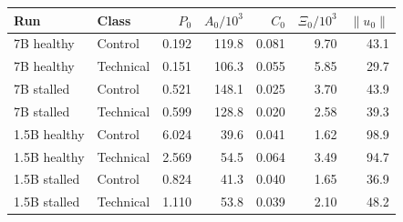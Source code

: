 \begin{tabular}{llrrrrr}
\toprule
Run & Class & $P_0$ & $A_0/10^3$ & $C_0$ & $\Xi_0/10^3$ & $\|u_0\|$ \\
\midrule
7B healthy & Control & 0.192 & 119.8 & 0.081 & 9.70 & 43.1 \\
7B healthy & Technical & 0.151 & 106.3 & 0.055 & 5.85 & 29.7 \\
7B stalled & Control & 0.521 & 148.1 & 0.025 & 3.70 & 43.9 \\
7B stalled & Technical & 0.599 & 128.8 & 0.020 & 2.58 & 39.3 \\
1.5B healthy & Control & 6.024 & 39.6 & 0.041 & 1.62 & 98.9 \\
1.5B healthy & Technical & 2.569 & 54.5 & 0.064 & 3.49 & 94.7 \\
1.5B stalled & Control & 0.824 & 41.3 & 0.040 & 1.65 & 36.9 \\
1.5B stalled & Technical & 1.110 & 53.8 & 0.039 & 2.10 & 48.2 \\
\bottomrule
\end{tabular}
